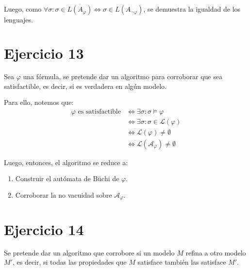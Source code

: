 \documentclass{article}
\begin{document}
Luego, como $\forall \sigma : \sigma \in \overline{L(A_\varphi)} \iff \sigma \in L(A_{\neg\varphi})$, se demuestra la igualdad de los lenguajes.

\section*{Ejercicio 13}
Sea $\varphi$ una fórmula, se pretende dar un algoritmo para corroborar que sea satisfactible, es decir, si es verdadera en algún modelo.

Para ello, notemos que:
\begin{equation*}
	\begin{aligned}
		\varphi \text{ es satisfactible} & \iff \exists \sigma : \sigma \vDash \varphi           \\
		                                 & \iff \exists \sigma : \sigma \in \mathcal{L}(\varphi) \\
		                                 & \iff \mathcal{L}(\varphi) \neq \emptyset              \\
		                                 & \iff \mathcal{L}(\mathcal{A_\varphi}) \neq \emptyset
	\end{aligned}
\end{equation*}

Luego, entonces, el algoritmo se reduce a:
\begin{enumerate}
	\item Construir el autómata de Büchi de $\varphi$.
	\item Corroborar la no vacuidad sobre $\mathcal{A}_\varphi$.
\end{enumerate}

\section*{Ejercicio 14}
Se pretende dar un algoritmo que corrobore si un modelo $M$ refina a otro modelo $M'$, es decir, si todas las propiedades que $M$ satisface también las satisface $M'$.
\end{document}
